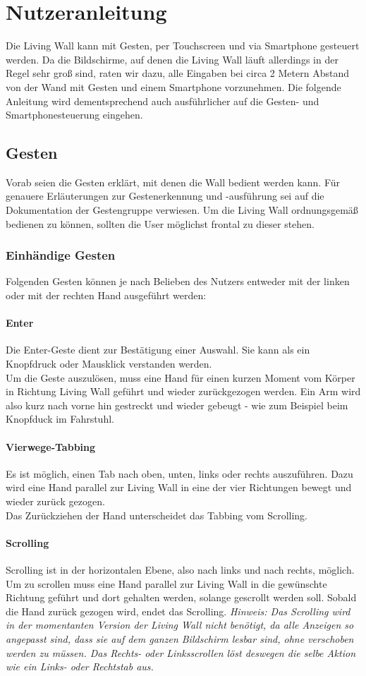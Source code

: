 \documentclass[10pt,a4paper]{report}
\begin{document}
\chapter{Nutzeranleitung}
Die Living Wall kann mit Gesten, per Touchscreen und via Smartphone gesteuert werden. Da die Bildschirme, auf denen die Living Wall läuft allerdings in der Regel sehr groß sind, raten wir dazu, alle Eingaben bei circa 2 Metern Abstand von der Wand mit Gesten und einem Smartphone vorzunehmen. Die folgende Anleitung wird dementsprechend auch ausführlicher auf die Gesten- und Smartphonesteuerung eingehen.

	\section{Gesten}
	Vorab seien die Gesten erklärt, mit denen die Wall bedient werden kann. Für genauere Erläuterungen zur Gestenerkennung und -ausführung sei auf die Dokumentation der Gestengruppe verwiesen. Um die Living Wall ordnungsgemäß bedienen zu können, sollten die User möglichst frontal zu dieser stehen.
		\subsection{Einhändige Gesten}
		Folgenden Gesten können je nach Belieben des Nutzers entweder mit der linken oder mit der rechten Hand ausgeführt werden:
		\subsubsection{Enter}
		Die Enter-Geste dient zur Bestätigung einer Auswahl. Sie kann als ein Knopfdruck oder Mausklick verstanden werden.\\
Um die Geste auszulösen, muss eine Hand für einen kurzen Moment vom Körper in Richtung Living Wall geführt und wieder zurückgezogen werden. Ein Arm wird also kurz nach vorne hin gestreckt und wieder gebeugt - wie zum Beispiel beim Knopfduck im Fahrstuhl.
		\subsubsection{Vierwege-Tabbing}
		Es ist möglich, einen Tab nach oben, unten, links oder rechts auszuführen. Dazu wird eine Hand parallel zur Living Wall in eine der vier Richtungen bewegt und wieder zurück gezogen.\\
Das Zurückziehen der Hand unterscheidet das Tabbing vom Scrolling.
		\subsubsection{Scrolling}
		Scrolling ist in der horizontalen Ebene, also nach links und nach rechts, möglich. Um zu scrollen muss eine Hand parallel zur Living Wall in die gewünschte Richtung geführt und dort gehalten werden, solange gescrollt werden soll. Sobald die Hand zurück gezogen wird, endet das Scrolling.
		\textit{Hinweis: Das Scrolling wird in der momentanten Version der Living Wall nicht benötigt, da alle Anzeigen so angepasst sind, dass sie auf dem ganzen Bildschirm lesbar sind, ohne verschoben werden zu müssen. Das Rechts- oder Linksscrollen löst deswegen die selbe Aktion wie ein Links- oder Rechtstab aus.}
\end{document}

